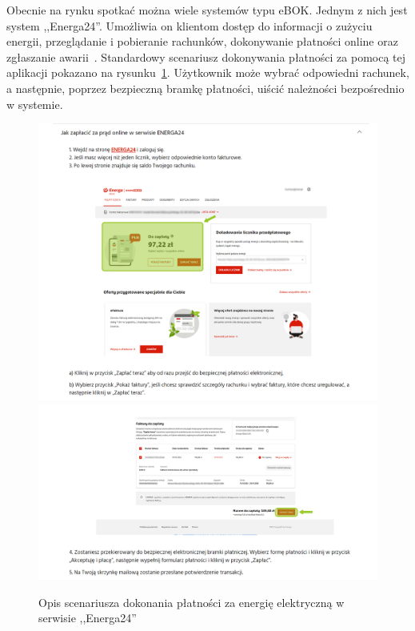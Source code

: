 Obecnie na rynku spotkać można wiele systemów typu eBOK. Jednym z nich jest system ,,Energa24''. Umożliwia on klientom dostęp do informacji o zużyciu energii, przeglądanie i pobieranie rachunków, dokonywanie płatności online oraz zgłaszanie awarii~\cite{energa}. Standardowy scenariusz dokonywania płatności za pomocą tej aplikacji pokazano na rysunku~\ref{fig:energa_manual}. Użytkownik może wybrać odpowiedni rachunek, a następnie, poprzez bezpieczną bramkę płatności, uiścić należności bezpośrednio w systemie.
\begin{figure}[htb]
	\centering
		\includegraphics[width=0.85\linewidth]{rys01/energa_manual_1.png} \\[-1ex]
		\includegraphics[width=0.85\linewidth]{rys01/energa_manual_2.png} \\[-1ex]
		\caption{Opis scenariusza dokonania płatności za energię elektryczną w serwisie ,,Energa24''~\cite{energa}}
	\label{fig:energa_manual}
\end{figure}

